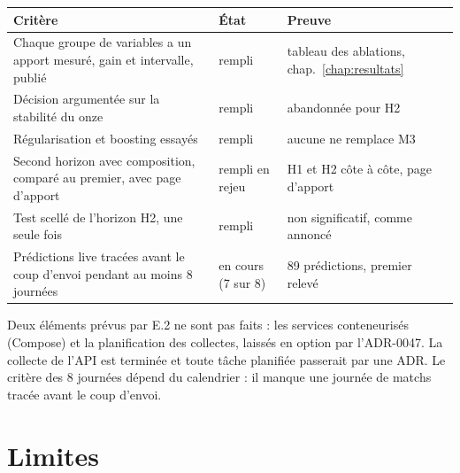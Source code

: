 \begin{center}
\begin{tabularx}{\textwidth}{Xll}
\toprule
Critère & État & Preuve \\
\midrule
Chaque groupe de variables a un apport mesuré, gain et intervalle, publié & rempli & tableau des
  ablations, chap.~\ref{chap:resultats} \\
Décision argumentée sur la stabilité du onze & rempli & abandonnée pour H2 \\
Régularisation et boosting essayés & rempli & aucune ne remplace M3 \\
Second horizon avec composition, comparé au premier, avec page d'apport & rempli en rejeu & H1 et H2 côte
  à côte, page d'apport \\
Test scellé de l'horizon H2, une seule fois & rempli & non significatif, comme annoncé \\
Prédictions live tracées avant le coup d'envoi pendant au moins 8 journées & en cours (7 sur 8) & 89
  prédictions, premier relevé \\
\bottomrule
\end{tabularx}
\end{center}

Deux éléments prévus par E.2 ne sont pas faits : les services conteneurisés (Compose) et la planification
des collectes, laissés en option par l'ADR-0047. La collecte de l'API est terminée et toute tâche planifiée
passerait par une ADR. Le critère des 8 journées dépend du calendrier : il manque une journée de matchs
tracée avant le coup d'envoi.

\section{Limites}

